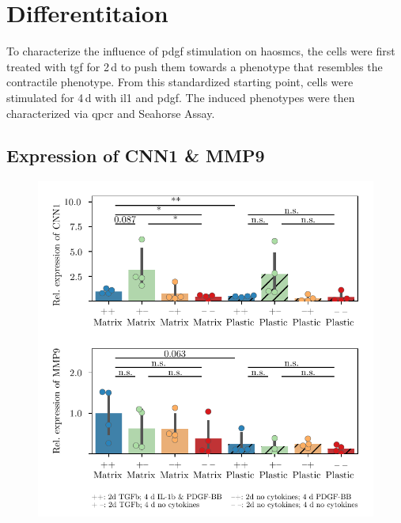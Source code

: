 \section{Differentitaion}
\label{sec:differentiation}
To characterize the influence of \ac{pdgf} stimulation on \acp{haosmc}, the cells were first treated with \ac{tgf} for 2\,d to push them towards a phenotype that resembles the contractile phenotype. From this standardized starting point, cells were stimulated for 4\,d with \ac{il1} and \ac{pdgf}. The induced phenotypes were then characterized via \ac{qpcr} and Seahorse Assay.

    \subsection{Expression of CNN1 \& MMP9}
    \label{subsec:qPCR}
    \begin{figure}[h!]
    \capstart
        \centering
    	\includegraphics{Abbildung/qPCR.pdf}


\end{figure}
